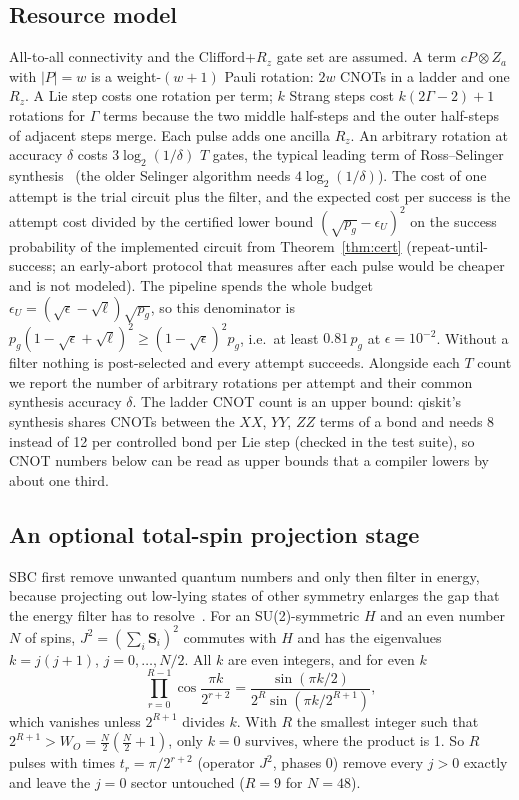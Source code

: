 \documentclass[aps,pra,twocolumn,superscriptaddress,nofootinbib]{revtex4-2}
\begin{document}
\subsection{Resource model}

All-to-all connectivity and the Clifford+$R_z$ gate set are assumed. A term $cP\otimes Z_a$ with
$|P|=w$ is a weight-$(w+1)$ Pauli rotation: $2w$ CNOTs in a ladder and one $R_z$. A Lie step costs one
rotation per term; $k$ Strang steps cost $k(2\Gamma-2)+1$ rotations for $\Gamma$ terms because the two
middle half-steps and the outer half-steps of adjacent steps merge. Each pulse adds one ancilla $R_z$.
An arbitrary rotation at accuracy $\delta$ costs $3\log_2(1/\delta)$ $T$ gates, the typical leading term
of Ross--Selinger synthesis~\cite{Ross2016} (the older Selinger algorithm needs $4\log_2(1/\delta)$). The cost of one attempt is the trial circuit plus the
filter, and the expected cost per success is the attempt cost divided by the certified lower bound
$(\sqrt{p_g}-\epsilon_U)^2$ on the success probability of the implemented circuit from
Theorem~\ref{thm:cert} (repeat-until-success; an early-abort protocol that measures after each pulse
would be cheaper and is not modeled). The pipeline spends the whole budget
$\epsilon_U=(\sqrt\epsilon-\sqrt\ell)\sqrt{p_g}$, so this denominator is
$p_g(1-\sqrt\epsilon+\sqrt\ell)^2\ge(1-\sqrt\epsilon)^2p_g$, i.e.\ at least $0.81\,p_g$ at
$\epsilon=10^{-2}$. Without a filter nothing is post-selected and every attempt succeeds. Alongside
each $T$ count we report the number of arbitrary rotations per attempt and their common synthesis
accuracy $\delta$. The ladder CNOT count is an upper bound: qiskit's
synthesis shares CNOTs between the $XX$, $YY$, $ZZ$ terms of a bond and needs 8 instead of 12 per
controlled bond per Lie step (checked in the test suite), so CNOT numbers below can be read as upper
bounds that a compiler lowers by about one third.


\subsection{An optional total-spin projection stage}
\label{sec:spin}

SBC first remove unwanted quantum numbers and only then filter in energy, because projecting out low-lying
states of other symmetry enlarges the gap that the energy filter has to resolve~\cite{Stetcu2023}. For an
SU(2)-symmetric $H$ and an even number $N$ of spins, $J^2=(\sum_i\mathbf S_i)^2$ commutes with $H$ and has the
eigenvalues $k=j(j+1)$, $j=0,\dots,N/2$. All $k$ are even integers, and for even $k$
\begin{equation}
\prod_{r=0}^{R-1}\cos\frac{\pi k}{2^{r+2}}=\frac{\sin(\pi k/2)}{2^R\sin(\pi k/2^{R+1})},
\label{eq:jladder}
\end{equation}
which vanishes unless $2^{R+1}$ divides $k$. With $R$ the smallest integer such that $2^{R+1}>W_O=\tfrac N2(\tfrac N2+1)$,
only $k=0$ survives, where the product is 1. So $R$ pulses with times $t_r=\pi/2^{r+2}$ (operator $J^2$,
phases 0) remove every $j>0$ exactly and leave the $j=0$ sector untouched ($R=9$ for $N=48$).
\end{document}
